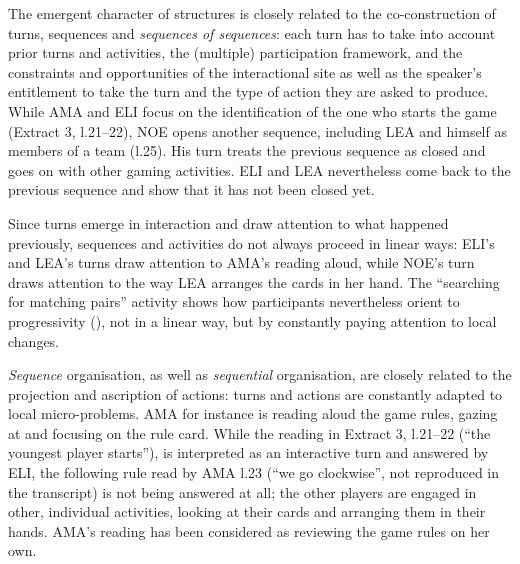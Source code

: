\documentclass[output=paper]{langscibook}
\begin{document}
The emergent character of structures is closely related to the co-construction of turns, sequences and \textit{sequences of sequences}: each turn has to take into account prior turns and activities, the (multiple) participation framework, and the constraints and opportunities of the interactional site as well as the speaker’s entitlement to take the turn and the type of action they are asked to produce. While AMA and ELI focus on the identification of the one who starts the game (Extract 3, l.21--22), NOE opens another sequence, including LEA and himself as members of a team (l.25). His turn treats the previous sequence as closed and goes on with other gaming activities. ELI and LEA nevertheless come back to the previous sequence and show that it has not been closed yet.

Since turns emerge in interaction and draw attention to what happened previously, sequences and activities do not always proceed in linear ways: ELI’s and LEA’s turns draw attention to AMA’s reading aloud, while NOE’s turn draws attention to the way LEA arranges the cards in her hand. The “searching for matching pairs” activity shows how participants nevertheless orient to progressivity (\citealt{StiversRobinson2006}), not in a linear way, but by constantly paying attention to local changes. 

\textit{Sequence} organisation, as well as \textit{sequential} organisation, are closely related to the projection and ascription of actions: turns and actions are constantly adapted to local micro-problems. AMA for instance is reading aloud the game rules, gazing at and focusing on the rule card. While the reading in Extract 3, l.21--22 (“the youngest player starts”), is interpreted as an interactive turn and answered by ELI, the following rule read by AMA l.23 (“we go clockwise”, not reproduced in the transcript) is not being answered at all; the other players are engaged in other, individual activities, looking at their cards and arranging them in their hands. AMA’s reading has been considered as reviewing the game rules on her own.
\end{document}
